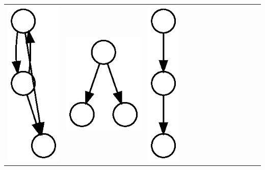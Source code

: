 \begin{table}[t!]
\begin{tabular}{l|lllllllllllll}
    \includegraphics[height=0.03\textheight]{M7-plain} &
    \includegraphics[height=0.03\textheight]{M8-plain} &
    \includegraphics[height=0.03\textheight]{M9-plain} &

\end{tabular}
\end{table}

